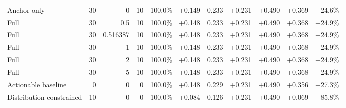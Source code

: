 \begin{table}[htbp]
\begin{tabular}{lrrrccccccc}
Anchor only & 30 & 0 & 10 & 100.0\% & +0.149 & 0.233 & +0.231 & +0.490 & +0.369 & +24.6\% \\
Full & 30 & 0.5 & 10 & 100.0\% & +0.148 & 0.233 & +0.231 & +0.490 & +0.368 & +24.9\% \\
Full & 30 & 0.516387 & 10 & 100.0\% & +0.148 & 0.233 & +0.231 & +0.490 & +0.368 & +24.9\% \\
Full & 30 & 1 & 10 & 100.0\% & +0.148 & 0.233 & +0.231 & +0.490 & +0.368 & +24.9\% \\
Full & 30 & 2 & 10 & 100.0\% & +0.148 & 0.233 & +0.231 & +0.490 & +0.368 & +24.9\% \\
Full & 30 & 5 & 10 & 100.0\% & +0.148 & 0.233 & +0.231 & +0.490 & +0.368 & +24.9\% \\
Actionable baseline & 0 & 0 & 0 & 100.0\% & +0.148 & 0.229 & +0.231 & +0.490 & +0.356 & +27.3\% \\
Distribution constrained & 10 & 0 & 0 & 100.0\% & +0.084 & 0.126 & +0.231 & +0.490 & +0.069 & +85.8\% \\
\bottomrule
\end{tabular}
\end{table}